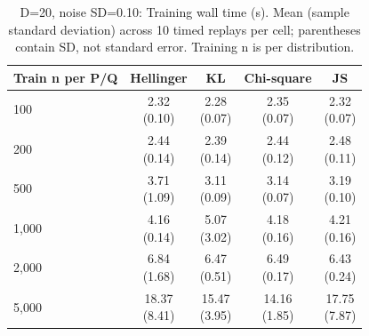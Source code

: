 \begin{table}[t]
\centering
\small
\setlength{\tabcolsep}{4pt}
\caption{D=20, noise SD=0.10: Training wall time (s). Mean (sample standard deviation) across 10 timed replays per cell; parentheses contain SD, not standard error. Training n is per distribution.}
\label{tab:sim-d-20-noise-sd-0-10-training-wall-time-s}
\begin{tabular}{lcccc}
\toprule
Train n per P/Q & Hellinger & KL & Chi-square & JS \\
\midrule
100 & \shortstack{2.32\\(0.10)} & \shortstack{2.28\\(0.07)} & \shortstack{2.35\\(0.07)} & \shortstack{2.32\\(0.07)} \\
200 & \shortstack{2.44\\(0.14)} & \shortstack{2.39\\(0.14)} & \shortstack{2.44\\(0.12)} & \shortstack{2.48\\(0.11)} \\
500 & \shortstack{3.71\\(1.09)} & \shortstack{3.11\\(0.09)} & \shortstack{3.14\\(0.07)} & \shortstack{3.19\\(0.10)} \\
1,000 & \shortstack{4.16\\(0.14)} & \shortstack{5.07\\(3.02)} & \shortstack{4.18\\(0.16)} & \shortstack{4.21\\(0.16)} \\
2,000 & \shortstack{6.84\\(1.68)} & \shortstack{6.47\\(0.51)} & \shortstack{6.49\\(0.17)} & \shortstack{6.43\\(0.24)} \\
5,000 & \shortstack{18.37\\(8.41)} & \shortstack{15.47\\(3.95)} & \shortstack{14.16\\(1.85)} & \shortstack{17.75\\(7.87)} \\
\bottomrule
\end{tabular}
\end{table}

